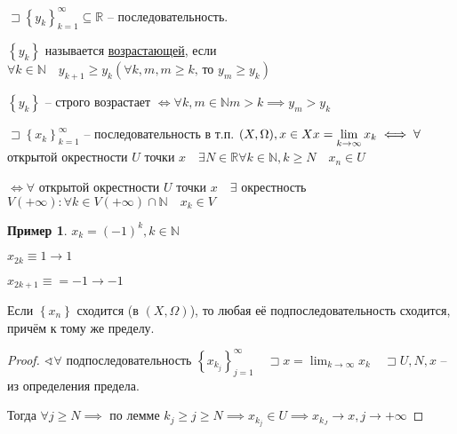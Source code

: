 \documentclass{book}
\newcommand\N{\ensuremath{\mathbb{N}}}
\newcommand\R{\ensuremath{\mathbb{R}}}
\theoremstyle{definition}
\newtheorem*{example}{Пример}
\begin{document}
\begin{definition}
    $\sqsupset \left\{ y_k \right\} _{k=1}^{\infty }\subseteq \R$ -- последовательность. 

    $\left\{ y_k \right\} $ называется \underline{возрастающей}, если $\forall k\in \N \quad y_{k+1}\geqslant y_k \left( \forall k, m, m\geqslant k \text{, то } y_m\geqslant y_k \right) $ 

    $\left\{ y_k \right\} $ -- строго возрастает $\iff  \forall k, m\in \N m>k\implies y_m>y_k$
\end{definition}
\begin{definition}
    $\sqsupset \left\{ x_k \right\} _{k=1}^{\infty }$ -- последовательность в т.п. $(X, \Omega), x\in X\quad \\ x = \lim_{k \to \infty} x_k \iff \forall $ открытой окрестности $U$ точки  $x\quad \exists N\in \R\forall k\in \N , k\geqslant N\quad x_n\in U$

    $\iff  \forall $ открытой окрестности $U$ точки $x\quad \exists $ окрестность $V(+\infty ): \forall k\in V(+\infty )\cap \N \quad x_k\in V$
\end{definition}
\begin{example}
    $x_k = (-1)^k, k\in \N $

    $x_{2k} \equiv 1 \to 1$

    $x_{2k+1}\equiv = -1 \to -1$
\end{example}
\begin{statement}
    Если $\left\{ x_{n}  \right\} $ сходится (в $(X, \Omega)$), то любая её подпоследовательность сходится, причём к тому же пределу.
\end{statement}
\begin{proof}
    $\sphericalangle \forall $ подпоследовательность $\left\{ x_{k_j} \right\} _{j=1}^{\infty }\quad \sqsupset x = \lim_{k \to \infty} x_k\quad \sqsupset U, N, x$ -- из определения предела.

    Тогда $\forall j\geqslant N \implies  $ по лемме $ k_j\geqslant j\geqslant N \implies  x_{k_j}\in U \implies  x_{k_J} \to x, j\to +\infty $
\end{proof}
\end{document}
